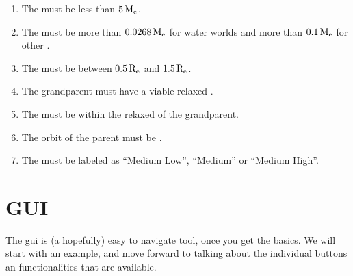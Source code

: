 \documentclass[letterpaper,10pt,english]{sphinxmanual}
\begin{document}
\begin{enumerate}
%
\item {} 
\sphinxAtStartPar
The {\hyperref[\detokenize{quantities/material/mass:id1}]{}} must be less than \(5 \, {\rm M_e}\).

\item {} 
\sphinxAtStartPar
The {\hyperref[\detokenize{quantities/material/mass:id1}]{}} must be more than \(0.0268 \, {\rm M_e}\) for water worlds and more than \(0.1 \, {\rm M_e}\) for other {\hyperref[\detokenize{quantities/material/composition_type:id1}]{}}.

\item {} 
\sphinxAtStartPar
The {\hyperref[\detokenize{quantities/geometric/radius:id1}]{}} must be between \(0.5 \, {\rm R_e}\) and \(1.5 \, {\rm R_e}\).

\item {} 
\sphinxAtStartPar
The {\hyperref[\detokenize{celestial_bodies/trojan_satellite:id1}]{}} grandparent must have a viable relaxed {\hyperref[\detokenize{quantities/habitability/habitable_zones/habitable_zones:id1}]{}}.

\item {} 
\sphinxAtStartPar
The {\hyperref[\detokenize{quantities/orbital/semi_major_axis:id1}]{}} must be within the relaxed {\hyperref[\detokenize{quantities/habitability/habitable_zones/habitable_zones:id1}]{}} of the grandparent.

\item {} 
\sphinxAtStartPar
The orbit of the parent must be {\hyperref[\detokenize{quantities/orbital/orbital_stability:id1}]{}}.

\item {} 
\sphinxAtStartPar
The {\hyperref[\detokenize{quantities/surface/internal_heating/tectonic_activity:id1}]{}} must be labeled as “Medium Low”, “Medium” or “Medium High”.

\end{enumerate}


\chapter{GUI}
\label{\detokenize{gui/gui:gui}}\label{\detokenize{gui/gui::doc}}\label{\detokenize{gui/gui:id1}}
\sphinxAtStartPar
The gui is (a hopefully) easy to navigate tool, once you get the basics. We will start
with an example, and move forward to talking about the individual buttons an functionalities
that are available.
\end{document}
